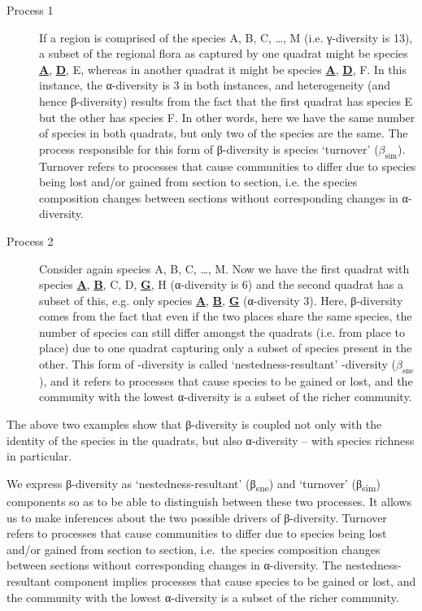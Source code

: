 \documentclass[10pt,a4,]{article}
\begin{document}
\begin{description}
\item[Process 1] If a region is comprised of the species A, B, C, …, M (i.e. γ-diversity is 13), a subset of the regional flora as captured by one quadrat might be species \underline{\textbf{A}}, \underline{\textbf{D}}, E, whereas in another quadrat it might be species \underline{\textbf{A}}, \underline{\textbf{D}}, F. In this instance, the α-diversity is 3 in both instances, and heterogeneity (and hence β-diversity) results from the fact that the first quadrat has species E but the other has species F. In other words, here we have the same number of species in both quadrats, but only two of the species are the same. The process responsible for this form of β-diversity is species ‘turnover’ ($\beta_\text{sim}$). Turnover refers to processes that cause communities to differ due to species being lost and/or gained from section to section, i.e. the species composition changes between sections without corresponding changes in α-diversity.

\item[Process 2] Consider again species A, B, C, …, M. Now we have the first quadrat with species \underline{\textbf{A}}, \underline{\textbf{B}}, C, D, \underline{\textbf{G}}, H (α-diversity is 6) and the second quadrat has a subset of this, e.g. only species \underline{\textbf{A}}, \underline{\textbf{B}}, \underline{\textbf{G}} (α-diversity 3). Here, β-diversity comes from the fact that even if the two places share the same species, the number of species can still differ amongst the quadrats (i.e. from place to place) due to one quadrat capturing only a subset of species present in the other. This form of \textbeta-diversity is called ‘nestedness-resultant’ \textbeta-diversity ($\beta_\text{sne}$), and it refers to  processes that cause species to be gained or lost, and the community with the lowest α-diversity is a subset of the richer community.
\end{description}

The above two examples show that β-diversity is coupled not only with
the identity of the species in the quadrats, but also α-diversity --
with species richness in particular.

We express β-diversity as `nestedness-resultant' (β\textsubscript{sne})
and `turnover' (β\textsubscript{sim}) components so as to be able to
distinguish between these two processes. It allows us to make inferences
about the two possible drivers of β-diversity. Turnover refers to
processes that cause communities to differ due to species being lost
and/or gained from section to section, i.e.~the species composition
changes between sections without corresponding changes in α-diversity.
The nestedness-resultant component implies processes that cause species
to be gained or lost, and the community with the lowest α-diversity is a
subset of the richer community.
\end{document}
